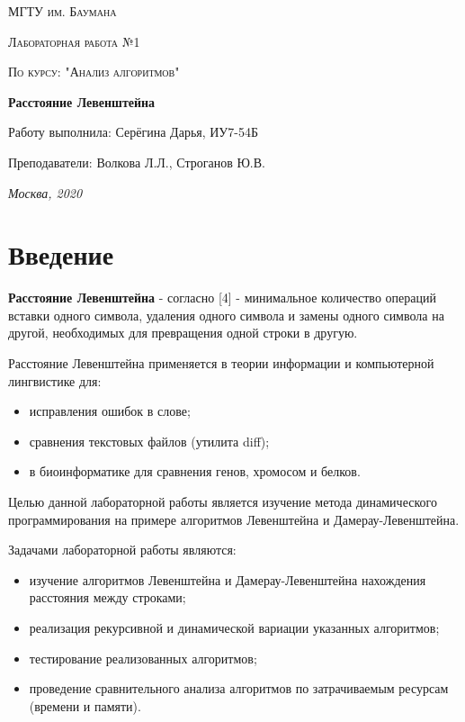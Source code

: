 \documentclass[12pt]{report}
\begin{document}
\begin{titlepage}
	\centering
	{\scshape\LARGE МГТУ им. Баумана \par}
	\vspace{3cm}
	{\scshape\Large Лабораторная работа №1\par}
	\vspace{0.5cm}	
	{\scshape\Large По курсу: "Анализ алгоритмов"\par}
	\vspace{1.5cm}
	{\huge\bfseries Расстояние Левенштейна\par}
	\vspace{2cm}
	\Large Работу выполнила: Серёгина Дарья, ИУ7-54Б\par
	\vspace{0.5cm}
	\Large Преподаватели:  Волкова Л.Л., Строганов Ю.В.\par

	\vfill
	\large \textit {Москва, 2020} \par
\end{titlepage}

\tableofcontents

\newpage
\chapter*{Введение}
\textbf{Расстояние Левенштейна} - согласно [4] - минимальное количество операций вставки одного символа, удаления одного символа и замены одного символа на другой, необходимых для превращения одной строки в другую.

Расстояние Левенштейна применяется в теории информации и компьютерной лингвистике для:

\begin{itemize}
	\item исправления ошибок в слове;
	\item сравнения текстовых файлов (утилита diff);
	\item в биоинформатике для сравнения генов, хромосом и белков.
\end{itemize}

Целью данной лабораторной работы является изучение метода динамического программирования на примере алгоритмов
Левенштейна и Дамерау-Левенштейна. 

Задачами лабораторной работы являются:
\begin{itemize}
  	\item изучение алгоритмов Левенштейна и Дамерау-Левенштейна нахождения расстояния между строками;
	\item реализация рекурсивной и динамической вариации указанных алгоритмов; 
	\item тестирование реализованных алгоритмов; 
	\item проведение сравнительного анализа алгоритмов по затрачиваемым ресурсам (времени и памяти).
\end{itemize}
\end{document}
